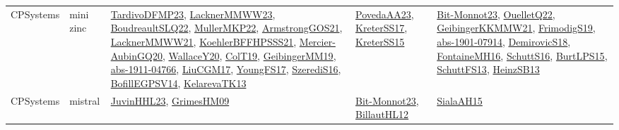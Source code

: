 {\begin{longtable}{llp{6cm}p{6cm}p{6cm}}
CPSystems & mini zinc & \href{papers/TardivoDFMP23.pdf}{TardivoDFMP23}\cite{TardivoDFMP23}, \href{articles/LacknerMMWW23.pdf}{LacknerMMWW23}\cite{LacknerMMWW23}, \href{papers/BoudreaultSLQ22.pdf}{BoudreaultSLQ22}\cite{BoudreaultSLQ22}, \href{articles/MullerMKP22.pdf}{MullerMKP22}\cite{MullerMKP22}, \href{papers/ArmstrongGOS21.pdf}{ArmstrongGOS21}\cite{ArmstrongGOS21}, \href{papers/LacknerMMWW21.pdf}{LacknerMMWW21}\cite{LacknerMMWW21}, \href{articles/KoehlerBFFHPSSS21.pdf}{KoehlerBFFHPSSS21}\cite{KoehlerBFFHPSSS21}, \href{papers/Mercier-AubinGQ20.pdf}{Mercier-AubinGQ20}\cite{Mercier-AubinGQ20}, \href{articles/WallaceY20.pdf}{WallaceY20}\cite{WallaceY20}, \href{papers/ColT19.pdf}{ColT19}\cite{ColT19}, \href{papers/GeibingerMM19.pdf}{GeibingerMM19}\cite{GeibingerMM19}, \href{articles/abs-1911-04766.pdf}{abs-1911-04766}\cite{abs-1911-04766}, \href{papers/LiuCGM17.pdf}{LiuCGM17}\cite{LiuCGM17}, \href{papers/YoungFS17.pdf}{YoungFS17}\cite{YoungFS17}, \href{papers/SzerediS16.pdf}{SzerediS16}\cite{SzerediS16}, \href{papers/BofillEGPSV14.pdf}{BofillEGPSV14}\cite{BofillEGPSV14}, \href{papers/KelarevaTK13.pdf}{KelarevaTK13}\cite{KelarevaTK13} & \href{papers/PovedaAA23.pdf}{PovedaAA23}\cite{PovedaAA23}, \href{articles/KreterSS17.pdf}{KreterSS17}\cite{KreterSS17}, \href{papers/KreterSS15.pdf}{KreterSS15}\cite{KreterSS15} & \href{papers/Bit-Monnot23.pdf}{Bit-Monnot23}\cite{Bit-Monnot23}, \href{papers/OuelletQ22.pdf}{OuelletQ22}\cite{OuelletQ22}, \href{papers/GeibingerKKMMW21.pdf}{GeibingerKKMMW21}\cite{GeibingerKKMMW21}, \href{papers/FrimodigS19.pdf}{FrimodigS19}\cite{FrimodigS19}, \href{articles/abs-1901-07914.pdf}{abs-1901-07914}\cite{abs-1901-07914}, \href{papers/DemirovicS18.pdf}{DemirovicS18}\cite{DemirovicS18}, \href{papers/FontaineMH16.pdf}{FontaineMH16}\cite{FontaineMH16}, \href{papers/SchuttS16.pdf}{SchuttS16}\cite{SchuttS16}, \href{papers/BurtLPS15.pdf}{BurtLPS15}\cite{BurtLPS15}, \href{papers/SchuttFS13.pdf}{SchuttFS13}\cite{SchuttFS13}, \href{articles/HeinzSB13.pdf}{HeinzSB13}\cite{HeinzSB13}\\
CPSystems & mistral & \href{papers/JuvinHHL23.pdf}{JuvinHHL23}\cite{JuvinHHL23}, \href{papers/GrimesHM09.pdf}{GrimesHM09}\cite{GrimesHM09} & \href{papers/Bit-Monnot23.pdf}{Bit-Monnot23}\cite{Bit-Monnot23}, \href{papers/BillautHL12.pdf}{BillautHL12}\cite{BillautHL12} & \href{papers/SialaAH15.pdf}{SialaAH15}\cite{SialaAH15}\\

\end{longtable}}

